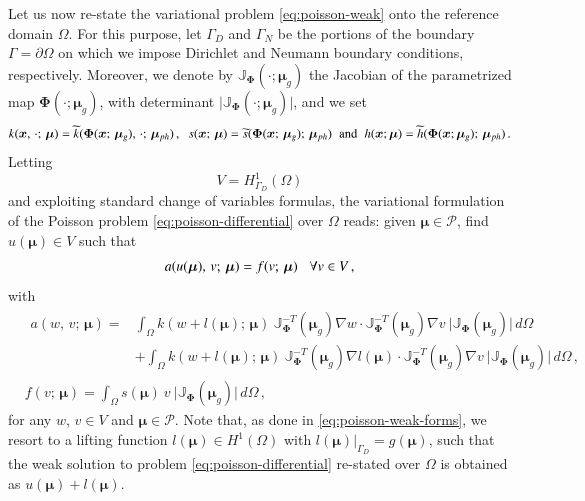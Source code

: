 \documentclass{elsarticle}
\numberwithin{equation}{section}
\theoremstyle{theorem}
\theoremstyle{definition}
\theoremstyle{remark}
\theoremstyle{proposition}
\numberwithin{figure}{section}
\newcommand{\wt}[1]{\widetilde{#1}}
\newcommand{\bg}[1]{\boldsymbol{#1}}
\begin{document}
		Let us now re-state the variational problem \eqref{eq:poisson-weak} onto the reference domain $\Omega$. For this purpose, let $\Gamma_D$ and $\Gamma_N$ be the portions of the boundary $\Gamma = \partial \Omega$ on which we impose Dirichlet and Neumann boundary conditions, respectively. Moreover, we denote by $\mathbb{J}_{\bg{\Phi}}(\cdot; \bg{\mu}_g)$ the Jacobian of the parametrized map $\bg{\Phi}(\cdot; \bg{\mu}_g)$, with determinant $\lvert \mathbb{J}_{\bg{\Phi}}(\cdot; \bg{\mu}_g) \rvert$, and we set
		\begin{equation*}
			k(\bg{x}, \, \cdot; \, \bg{\mu}) = \wt{k}(\bg{\Phi}(\bg{x}; \, \bg{\mu}_g), \, \cdot; \, \bg{\mu}_{ph}) \, , \hspace*{0.2cm} s(\bg{x}; \, \bg{\mu}) = \wt{s}(\bg{\Phi}(\bg{x}; \, \bg{\mu}_g); \, \bg{\mu}_{ph}) \hspace*{0.2cm} \text{and} \hspace*{0.2cm} h(\bg{x}; \bg{\mu}) = \wt{h}(\bg{\Phi}(\bg{x}; \bg{\mu}_g); \, \bg{\mu}_{ph}) \, .
		\end{equation*}
		Letting \[ V = H^1_{\Gamma_D}(\Omega) \] and exploiting standard change of variables formulas, the variational formulation of the Poisson problem \eqref{eq:poisson-differential} over $\Omega$ reads: given $\bg{\mu} \in \mathcal{P}$, find $u(\bg{\mu}) \in V$ such that
		\begin{equation*}
			\label{eq:poisson-weak-reference}
			a(u(\bg{\mu}), \, v; \, \bg{\mu}) = f(v; \, \bg{\mu}) \hspace*{0.3cm} \forall v \in V \, ,
		\end{equation*}
		with
		\begin{subequations}
			\label{eq:poisson-weak-forms-reference}
			\begin{align}
				\label{eq:poisson-weak-forms-reference-first}
				&
				\begin{aligned}
				a(w, \, v; \, \bg{\mu}) = & \int_{\Omega} k(w + l(\bg{\mu}); \, \bg{\mu}) ~ \mathbb{J}^{-T}_{\bg{\Phi}}(\bg{\mu}_g) \nabla w \cdot \mathbb{J}^{-T}_{\bg{\Phi}}(\bg{\mu}_g) \nabla v ~ \lvert \mathbb{J}_{\bg{\Phi}}(\bg{\mu}_g) \rvert \, d \Omega \\
				& + \int_{\Omega} k(w + l(\bg{\mu}); \, \bg{\mu}) ~ \mathbb{J}^{-T}_{\bg{\Phi}}(\bg{\mu}_g) \nabla l(\bg{\mu}) \cdot \mathbb{J}^{-T}_{\bg{\Phi}}(\bg{\mu}_g) \nabla v ~ \lvert \mathbb{J}_{\bg{\Phi}}(\bg{\mu}_g) \rvert \, d \Omega \, ,
				\end{aligned} \\
				\label{eq:poisson-weak-forms-reference-second}
				& f(v; \, \bg{\mu}) = \int_{\Omega} s(\bg{\mu}) ~ v ~ \lvert \mathbb{J}_{\bg{\Phi}}(\bg{\mu}_g) \rvert \, d \Omega \, ,  
			\end{align}
		\end{subequations}
		for any $w$, $v \in V$ and $\bg{\mu} \in \mathcal{P}$. Note that, as done in \eqref{eq:poisson-weak-forms}, we resort to a lifting function $l(\bg{\mu}) \in H^1(\Omega)$ with $l(\bg{\mu}) \big\rvert_{\Gamma_D} = g(\bg{\mu})$, such that the weak solution to problem \eqref{eq:poisson-differential} re-stated over $\Omega$ is obtained as $u(\bg{\mu}) + l(\bg{\mu})$.
		
\end{document}
